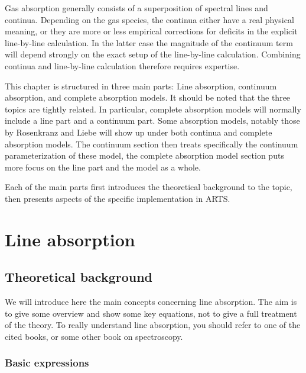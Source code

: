 Gas absorption generally consists of a superposition of spectral lines
and continua.  Depending on the gas species, the continua either have
a real physical meaning, or they are more or less empirical
corrections for deficits in the explicit line-by-line calculation.  In
the latter case the magnitude of the continuum term will depend
strongly on the exact setup of the line-by-line calculation.
Combining continua and line-by-line calculation therefore requires
expertise.

This chapter is structured in three main parts: Line absorption,
continuum absorption, and complete absorption models. It should be
noted that the three topics are tightly related. In particular,
complete absorption models will normally include a line part and a
continuum part. Some absorption models, notably those by Rosenkranz
and Liebe will show up under both continua and complete absorption
models. The continuum section then treats specifically the continuum
parameterization of these model, the complete absorption model section
puts more focus on the line part and the model as a whole.

Each of the main parts first introduces the theoretical background to the topic,
then presents aspects of the specific implementation in ARTS.
                                          


\section{Line absorption}
\label{sec:abs_theory:line_absorption}

\subsection{Theoretical background}
 
We will introduce here the main concepts concerning line
absorption. The aim is to give some overview and show some key
equations, not to give a full treatment of the theory. To really
understand line absorption, you should refer to one of the cited
books, or some other book on spectroscopy.

\subsubsection{Basic expressions} 

